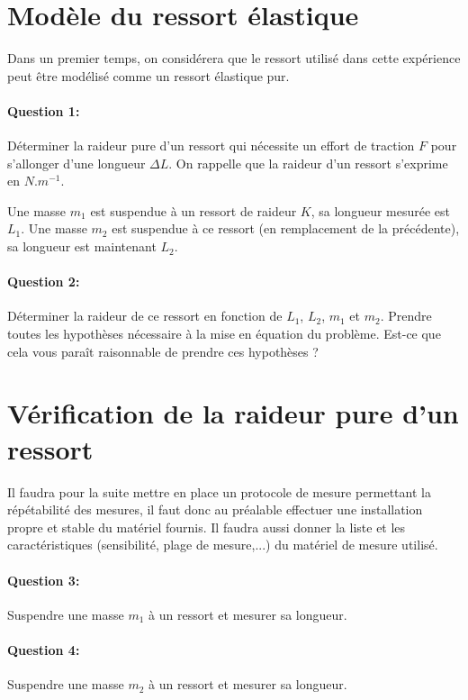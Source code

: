


\section{Modèle du ressort élastique} 

Dans un premier temps, on considérera que le ressort utilisé dans cette expérience peut être modélisé comme un ressort élastique pur. 

\paragraph{Question 1:} Déterminer la raideur pure d'un ressort qui nécessite un effort de traction $F$ pour s'allonger d'une longueur $\Delta L$. On rappelle que la raideur d'un ressort s'exprime en $N.m^{-1}$.

Une masse $m_1$ est suspendue à un ressort de raideur $K$, sa longueur mesurée est $L_1$. Une masse $m_2$ est suspendue à ce ressort (en remplacement de la précédente), sa longueur est maintenant $L_2$.

\paragraph{Question 2:} Déterminer la raideur de ce ressort en fonction de $L_1$, $L_2$, $m_1$ et $m_2$. Prendre toutes les hypothèses nécessaire à la mise en équation du problème. Est-ce que cela vous paraît raisonnable de prendre ces hypothèses ?

\section{Vérification de la raideur pure d'un ressort}

Il faudra pour la suite mettre en place un protocole de mesure permettant la répétabilité des mesures, il faut donc au préalable effectuer une installation propre et stable du matériel fournis. Il faudra aussi donner la liste et les caractéristiques (sensibilité, plage de mesure,...) du matériel de mesure utilisé.

\paragraph{Question 3:} Suspendre une masse $m_1$ à un ressort et mesurer sa longueur.

\paragraph{Question 4:} Suspendre une masse $m_2$ à un ressort et mesurer sa longueur.

